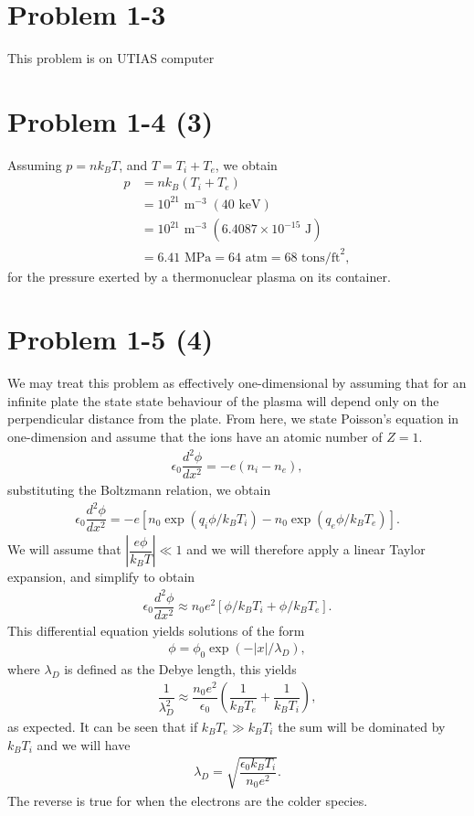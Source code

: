 \section*{Problem 1-3}
\label{sec:1-3}
This problem is on UTIAS computer

\section*{Problem 1-4 (3)}
\label{sec:1-4}
Assuming \(p = nk_BT\), and \(T = T_i + T_e\), we obtain
\begin{align}
	p &= nk_B(T_i + T_e) \\
	&= 10^{21}\text{ m}^{-3} \;(40\text{ keV}) \\
	&= 10^{21}\text{ m}^{-3} \;(6.4087\times10^{-15}\text{ J}) \\
	&= 6.41 \text{ MPa} = 64 \text{ atm} = 68 \text{ tons/ft}^2,
\end{align}
for the pressure exerted by a thermonuclear plasma on its container.

\section*{Problem 1-5 (4)}
\label{sec:1-5}
We may treat this problem as effectively one-dimensional by assuming that for an infinite plate the state state behaviour of the plasma will depend only on the perpendicular distance from the plate. From here, we state Poisson's equation in one-dimension and assume that the ions have an atomic number of \(Z = 1\).
\begin{align}
	\epsilon_0 \dfrac{d^2 \phi}{dx^2} = -e\left(n_i - n_e \right),
\end{align}
substituting the Boltzmann relation, we obtain
\begin{align}
	\epsilon_0 \dfrac{d^2 \phi}{dx^2} = -e\left[n_0\exp{(q_i\phi/k_BT_i)} - n_0\exp{(q_e\phi/k_BT_e)} \right].
\end{align}
We will assume that \(|\dfrac{e\phi}{k_BT}| \ll 1 \) and we will therefore apply a linear Taylor expansion, and simplify to obtain
\begin{align}
	\epsilon_0 \dfrac{d^2 \phi}{dx^2} \approx n_0e^2\left[\phi/k_BT_i + \phi/k_BT_e \right].
\end{align}
This differential equation yields solutions of the form
\begin{align}
	\phi = \phi_0 \exp{(-|x|/\lambda_D)},
\end{align}
where \(\lambda_D \) is defined as the Debye length, this yields
\begin{align}
	\dfrac{1}{\lambda_D^2} \approx \dfrac{n_0e^2}{\epsilon_0}\left(\dfrac{1}{k_BT_e} + \dfrac{1}{k_BT_i}  \right),
\end{align}
as expected. It can be seen that if \(k_BT_e \gg k_BT_i \) the sum will be dominated by \(k_BT_i \) and we will have
\begin{align}
	\lambda_D = \sqrt{\dfrac{\epsilon_0 k_BT_i}{n_0e^2}}.
\end{align}
The reverse is true for when the electrons are the colder species.

